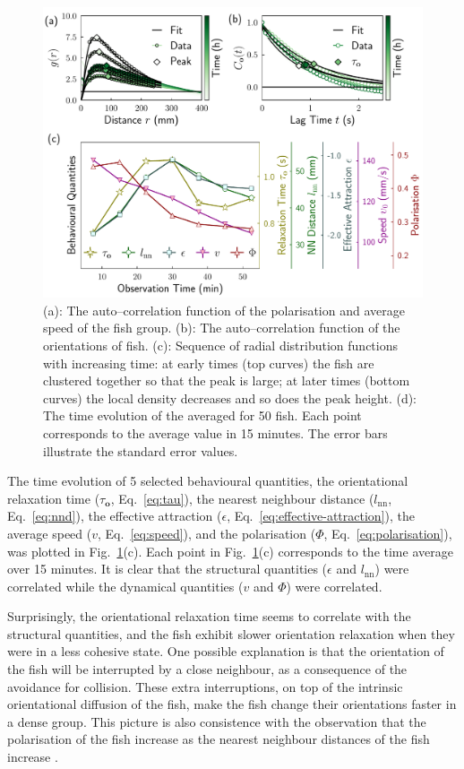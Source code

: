 \documentclass[11pt,twoside]{report}
\begin{document}
 \begin{figure}
  \includegraphics[width=\linewidth,outer]{change-states-2d-50}
  \caption[The behavioural descriptors of 50 zebrafish]{
  	(a): The auto--correlation function of the polarisation and average speed of the fish group.
	(b): The auto--correlation function of the orientations of fish.
	(c): Sequence of radial distribution functions with increasing time: at early times (top curves) the fish are clustered together so that the peak is large; at later times (bottom curves) the local density decreases and so does the peak height.
	(d): The time evolution of the averaged {\descriptors} for 50 {\smallfish} fish. Each point corresponds to the average value in 15 minutes.
	The error bars illustrate the standard error values.
  }
  \label{fig:change-states-2d}
\end{figure}


The time evolution of 5 selected behavioural quantities, the orientational relaxation time ($\tau_\mathbf{o}$, Eq.~\ref{eq:tau}), the nearest neighbour distance ($l_\mathrm{nn}$, Eq.~\ref{eq:nnd}), the effective attraction ($\epsilon$, Eq.~\ref{eq:effective-attraction}), the average speed ($v$, Eq.~\ref{eq:speed}), and the polarisation ($\Phi$, Eq.~\ref{eq:polarisation}), was plotted in Fig.~\ref{fig:change-states-2d}(c). Each point in Fig.~\ref{fig:change-states-2d}(c) corresponds to the time average over 15 minutes. It is clear that the structural quantities ($\epsilon$ and $l_\mathrm{nn}$) were correlated while the dynamical quantities ($v$ and $\Phi$) were correlated.

Surprisingly, the orientational relaxation time seems to correlate with the structural quantities, and the fish exhibit slower orientation relaxation when they were in a less cohesive state. One possible explanation is that the orientation of the fish will be interrupted by a close neighbour, as a consequence of the avoidance for collision. These extra interruptions, on top of the intrinsic orientational diffusion of the fish, make the fish change their orientations faster in a dense group. This picture is also consistence with the observation that the polarisation of the fish increase as the nearest neighbour distances of the fish increase \cite{miller2012}.
\end{document}
